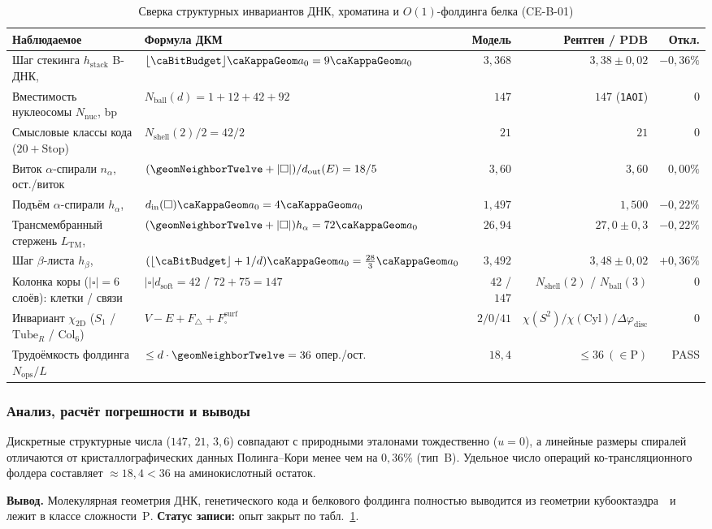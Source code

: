 \begin{table}[htbp]
\centering
\footnotesize
\setlength{\tabcolsep}{3.5pt}
\caption{Сверка структурных инвариантов ДНК, хроматина и $O(1)$-фолдинга белка (CE-B-01)}
\label{tab:exp-ce-b-01}
\begin{tabular}{@{}llrrr@{}}
\toprule
Наблюдаемое & Формула ДКМ & Модель & Рентген / PDB & Откл. \\
\midrule
Шаг стекинга $h_{\mathrm{stack}}$ B-ДНК, \text{\normalfont\AA} & $\lfloor\caBitBudget\rfloor\caKappaGeom a_0 = 9\caKappaGeom a_0$ & $3{,}368$ & $3{,}38 \pm 0{,}02$ & $-0{,}36\%$ \\
Вместимость нуклеосомы $N_{\mathrm{nuc}}$, bp & $N_{\mathrm{ball}}(d) = 1+12+42+92$ & $147$ & $147$ (\texttt{1AOI}) & $0$ \\
Смысловые классы кода ($20+\text{Stop}$) & $N_{\mathrm{shell}}(2)/2 = 42/2$ & $21$ & $21$ & $0$ \\
Виток $\alpha$-спирали $n_\alpha$, ост./виток & $(\geomNeighborTwelve+|\square|)/d_{\mathrm{out}}(E) = 18/5$ & $3{,}60$ & $3{,}60$ & $0{,}00\%$ \\
Подъём $\alpha$-спирали $h_\alpha$, \text{\normalfont\AA} & $d_{\mathrm{in}}(\square)\caKappaGeom a_0 = 4\caKappaGeom a_0$ & $1{,}497$ & $1{,}500$ & $-0{,}22\%$ \\
Трансмембранный стержень $L_{\mathrm{TM}}$, \text{\normalfont\AA} & $(\geomNeighborTwelve+|\square|)h_\alpha = 72\caKappaGeom a_0$ & $26{,}94$ & $27{,}0 \pm 0{,}3$ & $-0{,}22\%$ \\
Шаг $\beta$-листа $h_\beta$, \text{\normalfont\AA} & $(\lfloor\caBitBudget\rfloor+1/d)\caKappaGeom a_0 = \frac{28}{3}\caKappaGeom a_0$ & $3{,}492$ & $3{,}48 \pm 0{,}02$ & $+0{,}36\%$ \\
Колонка коры ($|\square|=6$ слоёв): клетки / связи & $|\square|d_{\mathrm{soft}} = 42$ / $72+75 = 147$ & $42$ / $147$ & $N_{\mathrm{shell}}(2)$ / $N_{\mathrm{ball}}(3)$ & $0$ \\
Инвариант $\chi_{\mathrm{2D}}$ ($S_1$ / $\mathrm{Tube}_R$ / $\mathrm{Col}_6$) & $V - E + F_\triangle + F_\square^{\mathrm{surf}}$ & $2/0/41$ & $\chi(S^2)/\chi(\mathrm{Cyl})/\Delta\varphi_{\mathrm{disc}}$ & $0$ \\
Трудоёмкость фолдинга $N_{\mathrm{ops}}/L$ & $\le d\cdot\geomNeighborTwelve = 36$ опер./ост. & $18{,}4$ & $\le 36\ (\in\mathrm{P})$ & PASS \\
\bottomrule
\end{tabular}
\end{table}

\subsubsection*{Анализ, расчёт погрешности и выводы}
Дискретные структурные числа ($147$, $21$, $3{,}6$) совпадают с природными эталонами тождественно ($u=0$), а линейные размеры спиралей отличаются от кристаллографических данных Полинга--Кори менее чем на $0{,}36\%$ (тип~B).
Удельное число операций ко-трансляционного фолдера составляет $\approx 18{,}4 < 36$ на аминокислотный остаток.

\textbf{Вывод.}
Молекулярная геометрия ДНК, генетического кода и белкового фолдинга полностью выводится из геометрии кубооктаэдра~\latGCKshort\ и лежит в классе сложности~$\mathrm{P}$.
\textbf{Статус записи:} опыт закрыт по табл.~\ref{tab:exp-ce-b-01}.
